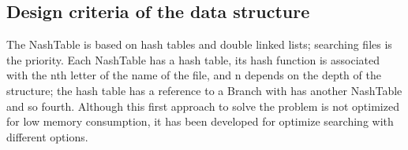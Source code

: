 \documentclass{sig-alternate-05-2015}
\begin{document}
  \subsection{Design criteria of the data structure}
    The NashTable is based on hash tables and double linked lists; searching files
    is the priority. Each NashTable has a hash table, its hash function is associated with the
    nth letter of the name of the file, and n depends on the depth of the structure;
    the hash table has a reference to a Branch with has another NashTable and so fourth.
    Although this first approach to solve the problem is not optimized for low memory consumption,
    it has been developed for optimize searching with different options.



  
  
\end{document}
